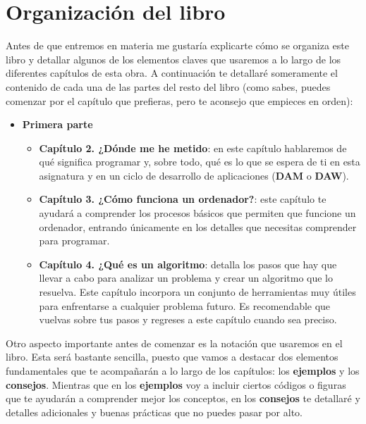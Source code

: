 \section{Organización del libro}

Antes de que entremos en materia me gustaría explicarte cómo se organiza este libro y detallar algunos de los elementos claves que
usaremos a lo largo de los diferentes capítulos de esta obra. A continuación te detallaré someramente el contenido de cada
una de las partes del resto del libro (como sabes, puedes comenzar por el capítulo que prefieras, pero te aconsejo que empieces 
en orden):

\begin{itemize}
    \item \textbf{Primera parte} {
        \begin{itemize}
            \item \textbf{Capítulo 2. ¿Dónde me he metido}: en este capítulo hablaremos de qué significa programar y, sobre todo, 
            qué es lo que se espera de ti en esta asignatura y en un ciclo de desarrollo de aplicaciones (\textbf{DAM} o \textbf{DAW}).
            \item \textbf{Capítulo 3. ¿Cómo funciona un ordenador?}: este capítulo te ayudará a comprender los procesos básicos que
            permiten que funcione un ordenador, entrando únicamente en los detalles que necesitas comprender para programar.
            \item \textbf{Capítulo 4. ¿Qué es un algoritmo}: detalla los pasos que hay que llevar a cabo para analizar un problema y
            crear un algoritmo que lo resuelva. Este capítulo incorpora un conjunto de herramientas muy útiles para enfrentarse a
            cualquier problema futuro. Es recomendable que vuelvas sobre tus pasos y regreses a este capítulo cuando sea preciso.
        \end{itemize}
        }

\end{itemize}

Otro aspecto importante antes de comenzar es la notación que usaremos en el libro. Esta será bastante sencilla, puesto que vamos
a destacar dos elementos fundamentales que te acompañarán a lo largo de los capítulos: los \textbf{ejemplos} y los \textbf{consejos}. Mientras que
en los \textbf{ejemplos} voy a incluir ciertos códigos o figuras que te ayudarán a comprender mejor los conceptos, en los \textbf{consejos} te detallaré
y detalles adicionales y buenas prácticas que no puedes pasar por alto.

